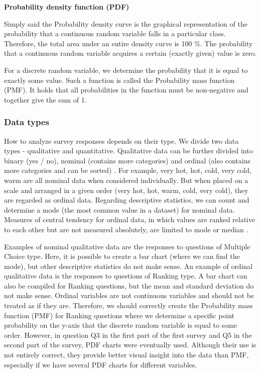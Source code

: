 \documentclass[a4paper,10pt,twoside]{article}
\begin{document}
\bigskip
\noindent \textbf {Probability density function (PDF)}

\noindent Simply said the Probability density curve is the graphical representation of the probability that a continuous random variable falls in a particular class. Therefore, the total area under an entire density curve is 100 \%. The probability that a continuous random variable acquires a certain (exactly given) value is zero.

For a discrete random variable, we determine the probability that it is equal to exactly some value. Such a function is called the Probability mass function (PMF). It holds that all probabilities in the function must be non-negative and together give the sum of 1.

\newpage
\vspace*{-1cm}
\subsubsection{Data types}

How to analyze survey responses depends on their type. We divide two data types - qualitative and quantitative. Qualitative data can be further divided into binary (yes / no), nominal (contains more categories) and ordinal (also contains more categories and can be sorted) \cite{minitab}. For example, very hot, hot, cold, very cold, warm are all nominal data when considered individually. But when placed on a scale and arranged in a given order (very hot, hot, warm, cold, very cold), they are regarded as ordinal data. Regarding descriptive statistics, we can count and determine a mode (the most common value in a dataset) for nominal data. Measures of central tendency for ordinal data, in which values are ranked relative to each other but are not measured absolutely, are limited to mode or median \cite{ordinaldata}.

Examples of nominal qualitative data are the responses to questions of Multiple Choice type. Here, it is possible to create a bar chart (where we can find the mode), but other descriptive statistics do not make sense. An example of ordinal qualitative data is the responses to questions of Ranking type. A bar chart can also be compiled for Ranking questions, but the mean and standard deviation do not make sense. Ordinal variables are not continuous variables and should not be treated as if they are. Therefore, we should correctly create the Probability mass function (PMF) for Ranking questions where we determine a specific point probability on the y-axis that the discrete random variable is equal to some order. However, in question Q3 in the first part of the first survey and Q5 in the second part of the survey, PDF charts were eventually used. Although their use is not entirely correct, they provide better visual insight into the data than PMF, especially if we have several PDF charts for different variables.
\end{document}
